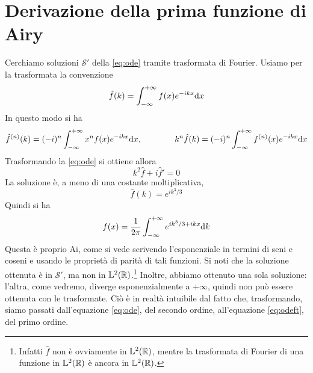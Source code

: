 \documentclass[11 pt]{article}
\newcommand{\ai}{\mathrm{Ai}}
\renewcommand{\S}{\mathcal{S}}
\begin{document}
	\section{Derivazione della prima funzione di Airy}
	Cerchiamo soluzioni $\S'$ della \ref{eq:ode} tramite trasformata di Fourier. Usiamo per la trasformata la convenzione
	\[\hat{f}(k)=\int_{-\infty}^{+\infty}f(x)e^{-ikx}\mathrm{d} x\]
	In questo modo si ha
	\[\hat{f}^{(n)}(k)=(-i)^n\int_{-\infty}^{+\infty}x^nf(x)e^{-ikx}\mathrm{d} x,\qquad\qquad k^n\hat{f}(k)=(-i)^n\int_{-\infty}^{+\infty}f^{(n)}(x)e^{-ikx}\mathrm{d} x\]
	Trasformando la \ref{eq:ode} si ottiene allora
	\begin{equation}k^2\hat{f}+i\hat{f}'=0\label{eq:odeft}\end{equation}
	La soluzione è, a meno di una costante moltiplicativa,
	\[\hat{f}(k)=e^{ik^3/3}\]
	Quindi si ha
	\[f(x)=\frac{1}{2\pi}\int_{-\infty}^{+\infty}e^{ik^3/3+ikx}\mathrm{d} k\]
	Questa è proprio $\ai$, come si vede scrivendo l'esponenziale in termini di seni e coseni e usando le proprietà di parità di tali funzioni. Si noti che la soluzione ottenuta è in $\S'$, ma non in $\mathbb{L}^2(\mathbb{R})$.\footnote{Infatti $\hat{f}$ non è ovviamente in $\mathbb{L}^2(\mathbb{R})$, mentre la trasformata di Fourier di una funzione in $\mathbb{L}^2(\mathbb{R})$ è ancora in $\mathbb{L}^2(\mathbb{R})$.} Inoltre, abbiamo ottenuto una sola soluzione: l'altra, come vedremo, diverge esponenzialmente a $+\infty$, quindi non può essere ottenuta con le trasformate. Ciò è in realtà intuibile dal fatto che, trasformando, siamo passati dall'equazione \ref{eq:ode}, del secondo ordine, all'equazione \ref{eq:odeft}, del primo ordine.
\end{document}
